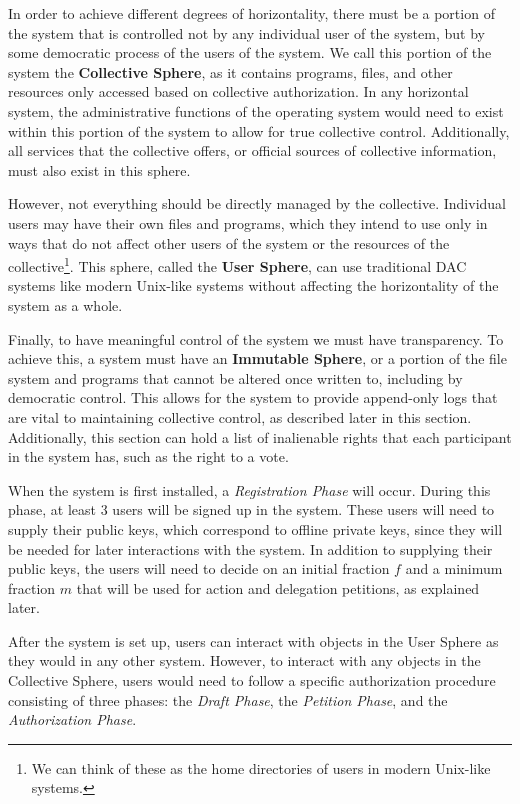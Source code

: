 In order to achieve different degrees of horizontality, there must be a portion
of the system that is controlled not by any individual user of the system, but
by some democratic process of the users of the system. We call this portion of
the system the \textbf{Collective Sphere}, as it contains programs, files, and
other resources only accessed based on collective authorization. In any
horizontal system, the administrative functions of the operating system would
need to exist within this portion of the system to allow for true collective
control. Additionally, all services that the collective offers, or official
sources of collective information, must also exist in this sphere.

However, not everything should be directly managed by the collective. Individual
users may have their own files and programs, which they intend to use only in
ways that do not affect other users of the system or the resources of the
collective\footnote{We can think of these as the home directories of users in
modern Unix-like systems.}. This sphere, called the \textbf{User Sphere},
can use traditional DAC systems like modern Unix-like systems without affecting
the horizontality of the system as a whole.

Finally, to have meaningful control of the system we must have transparency. To
achieve this, a system must have an \textbf{Immutable Sphere}, or a portion of
the file system and programs that cannot be altered once written to, including
by democratic control. This allows for the system to provide append-only logs
that are vital to maintaining collective control, as described later in this
section. Additionally, this section can hold a list of inalienable rights that
each participant in the system has, such as the right to a vote.

When the system is first installed, a \textit{Registration Phase} will occur.
During this phase, at least 3 users will be signed up in the system. These users
will need to supply their public keys, which correspond to offline private keys,
since they will be needed for later interactions with the system. In addition to
supplying their public keys, the users will need to decide on an initial
fraction $f$ and a minimum fraction $m$ that will be used for action and
delegation petitions, as explained later.

After the system is set up, users can interact with objects in the User Sphere
as they would in any other system. However, to interact with any objects in the
Collective Sphere, users would need to follow a specific authorization
procedure consisting of three phases: the \textit{Draft Phase}, the 
\textit{Petition Phase}, and the \textit{Authorization Phase}.

